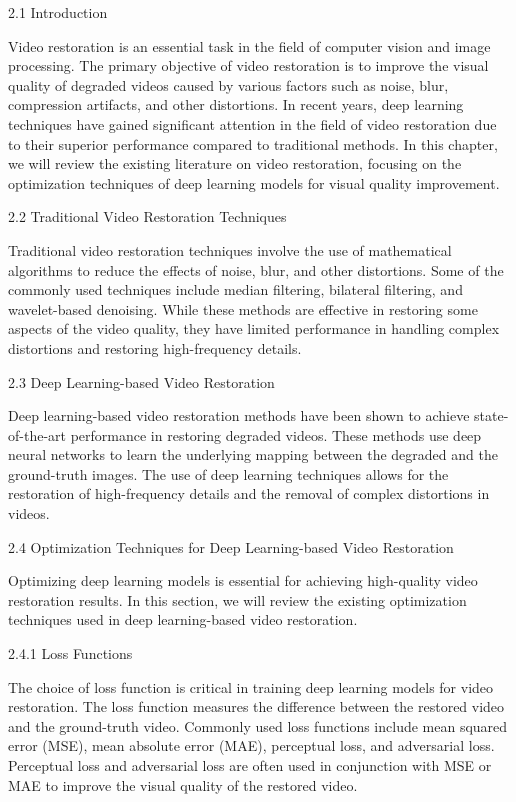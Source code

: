 \label{chap:Background}

2.1 Introduction

Video restoration is an essential task in the field of computer vision and image processing. The primary objective of video restoration is to improve the visual quality of degraded videos caused by various factors such as noise, blur, compression artifacts, and other distortions. In recent years, deep learning techniques have gained significant attention in the field of video restoration due to their superior performance compared to traditional methods. In this chapter, we will review the existing literature on video restoration, focusing on the optimization techniques of deep learning models for visual quality improvement.

2.2 Traditional Video Restoration Techniques

Traditional video restoration techniques involve the use of mathematical algorithms to reduce the effects of noise, blur, and other distortions. Some of the commonly used techniques include median filtering, bilateral filtering, and wavelet-based denoising. While these methods are effective in restoring some aspects of the video quality, they have limited performance in handling complex distortions and restoring high-frequency details.

2.3 Deep Learning-based Video Restoration

Deep learning-based video restoration methods have been shown to achieve state-of-the-art performance in restoring degraded videos. These methods use deep neural networks to learn the underlying mapping between the degraded and the ground-truth images. The use of deep learning techniques allows for the restoration of high-frequency details and the removal of complex distortions in videos.

2.4 Optimization Techniques for Deep Learning-based Video Restoration

Optimizing deep learning models is essential for achieving high-quality video restoration results. In this section, we will review the existing optimization techniques used in deep learning-based video restoration.

2.4.1 Loss Functions

The choice of loss function is critical in training deep learning models for video restoration. The loss function measures the difference between the restored video and the ground-truth video. Commonly used loss functions include mean squared error (MSE), mean absolute error (MAE), perceptual loss, and adversarial loss. Perceptual loss and adversarial loss are often used in conjunction with MSE or MAE to improve the visual quality of the restored video.

